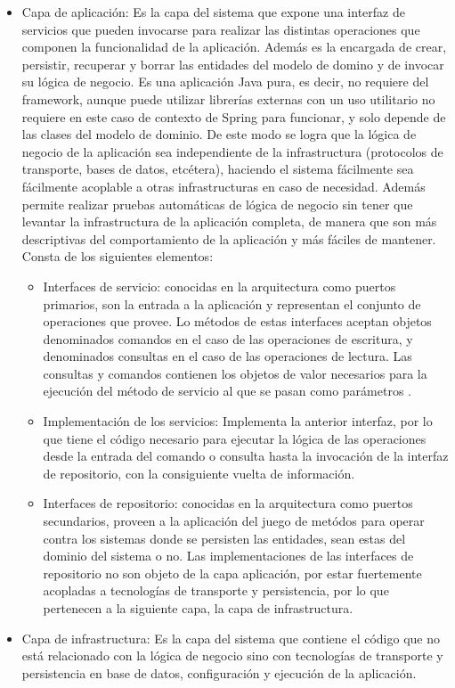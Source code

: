 \documentclass[a4paper, 12pt]{book}
\begin{document}
\begin{itemize}
        \item Capa de aplicación: Es la capa del sistema que expone una interfaz de servicios que pueden invocarse para realizar las distintas operaciones que componen la funcionalidad de la aplicación. Además es la encargada de crear, persistir, recuperar y borrar las entidades del modelo de domino y de invocar su lógica de negocio.
        Es una aplicación Java pura, es decir, no requiere del framework, aunque puede utilizar librerías externas con un uso utilitario no requiere en este caso de contexto de Spring para funcionar, y solo depende de las clases del modelo de dominio.
        De este modo se logra que la lógica de negocio de la aplicación sea independiente de la infrastructura (protocolos de transporte, bases de datos, etcétera), haciendo el sistema fácilmente sea fácilmente acoplable a otras infrastructuras en caso de necesidad.
        Además permite realizar pruebas automáticas de lógica de negocio sin tener que levantar la infrastructura de la aplicación completa, de manera que son más descriptivas del comportamiento de la aplicación y más fáciles de mantener.
        Consta de los siguientes elementos:

        \begin{itemize}
            \item Interfaces de servicio: conocidas en la arquitectura como puertos primarios, son la entrada a la aplicación y representan el conjunto de operaciones que provee. Lo métodos de estas interfaces aceptan objetos denominados comandos en el caso de las operaciones de escritura, y denominados consultas en el caso de las operaciones de lectura.
            Las consultas y comandos contienen los objetos de valor necesarios para la ejecución del método de servicio al que se pasan como parámetros .
            \item Implementación de los servicios: Implementa la anterior interfaz, por lo que tiene el código necesario para ejecutar la lógica de las operaciones desde la entrada del comando o consulta hasta la invocación de la interfaz de repositorio, con la consiguiente vuelta de información.
            \item Interfaces de repositorio: conocidas en la arquitectura como puertos secundarios, proveen a la aplicación del juego de metódos para operar contra los sistemas donde se persisten las entidades, sean estas del dominio del sistema o no.
            Las implementaciones de las interfaces de repositorio no son objeto de la capa aplicación, por estar fuertemente acopladas a tecnologías de transporte y persistencia, por lo que pertenecen a la siguiente capa, la capa de infrastructura.
        \end{itemize}


        \item Capa de infrastructura: Es la capa del sistema que contiene el código que no está relacionado con la lógica de negocio sino con tecnologías de transporte y persistencia en base de datos, configuración y ejecución de la aplicación.
    \end{itemize}
\end{document}
